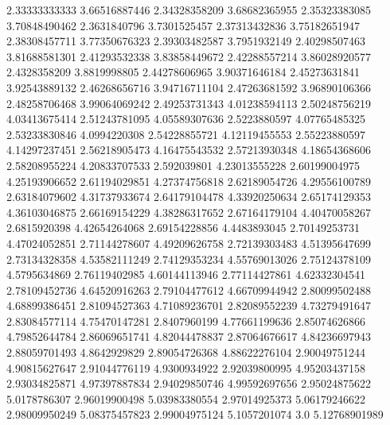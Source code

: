   2.33333333333    3.66516887446
  2.34328358209    3.68682365955
  2.35323383085    3.70848490462
   2.3631840796     3.7301525457
  2.37313432836    3.75182651947
  2.38308457711    3.77350676323
  2.39303482587     3.7951932149
  2.40298507463    3.81688581301
  2.41293532338    3.83858449672
  2.42288557214    3.86028920577
   2.4328358209     3.8819998805
  2.44278606965    3.90371646184
  2.45273631841    3.92543889132
  2.46268656716    3.94716711104
  2.47263681592    3.96890106366
  2.48258706468    3.99064069242
  2.49253731343    4.01238594113
  2.50248756219    4.03413675414
  2.51243781095    4.05589307636
   2.5223880597    4.07765485325
  2.53233830846     4.0994220308
  2.54228855721    4.12119455553
  2.55223880597    4.14297237451
  2.56218905473    4.16475543532
  2.57213930348    4.18654368606
  2.58208955224    4.20833707533
    2.592039801    4.23013555228
  2.60199004975    4.25193906652
  2.61194029851    4.27374756818
  2.62189054726    4.29556100789
  2.63184079602    4.31737933674
  2.64179104478    4.33920250634
  2.65174129353    4.36103046875
  2.66169154229    4.38286317652
  2.67164179104    4.40470058267
   2.6815920398    4.42654264068
  2.69154228856     4.4483893045
  2.70149253731    4.47024052851
  2.71144278607    4.49209626758
  2.72139303483    4.51395647699
  2.73134328358    4.53582111249
  2.74129353234    4.55769013026
  2.75124378109     4.5795634869
  2.76119402985    4.60144113946
  2.77114427861    4.62332304541
  2.78109452736    4.64520916263
  2.79104477612    4.66709944942
  2.80099502488    4.68899386451
  2.81094527363    4.71089236701
  2.82089552239    4.73279491647
  2.83084577114    4.75470147281
   2.8407960199    4.77661199636
  2.85074626866    4.79852644784
  2.86069651741    4.82044478837
  2.87064676617    4.84236697943
  2.88059701493     4.8642929829
  2.89054726368    4.88622276104
  2.90049751244    4.90815627647
  2.91044776119     4.9300934922
  2.92039800995    4.95203437158
  2.93034825871    4.97397887834
  2.94029850746    4.99592697656
  2.95024875622     5.0178786307
  2.96019900498    5.03983380554
  2.97014925373    5.06179246622
  2.98009950249    5.08375457823
  2.99004975124     5.1057201074
            3.0    5.12768901989

